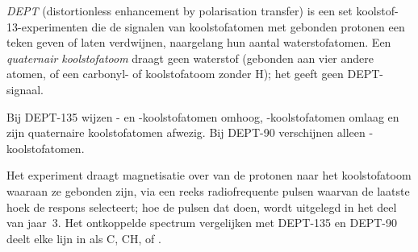 \begin{definition}[DEPT]\label{def:b2:structure-determination:dept}
\emph{DEPT} (distortionless enhancement by polarisation transfer) is een set koolstof-13-experimenten
die de signalen van koolstofatomen met gebonden protonen een teken geven of laten verdwijnen, naargelang
hun aantal waterstofatomen. Een \emph{quaternair koolstofatoom} draagt geen waterstof
(gebonden aan vier andere atomen, of een carbonyl- of  koolstofatoom zonder H); het geeft geen DEPT-signaal.
\end{definition}

\begin{proposition}\label{prop:b2:structure-determination:dept}
Bij DEPT-135 wijzen - en -koolstofatomen omhoog, -koolstofatomen omlaag en zijn quaternaire koolstofatomen
afwezig. Bij DEPT-90 verschijnen alleen -koolstofatomen.
\end{proposition}

\admitted

Het experiment draagt magnetisatie over van de protonen naar het koolstofatoom waaraan ze gebonden zijn, via een
reeks radiofrequente pulsen waarvan de laatste hoek de respons selecteert; hoe de pulsen dat doen, wordt
uitgelegd in het deel van jaar~3. Het ontkoppelde spectrum vergelijken met DEPT-135 en DEPT-90 deelt elke
lijn in als C, CH,  of .

